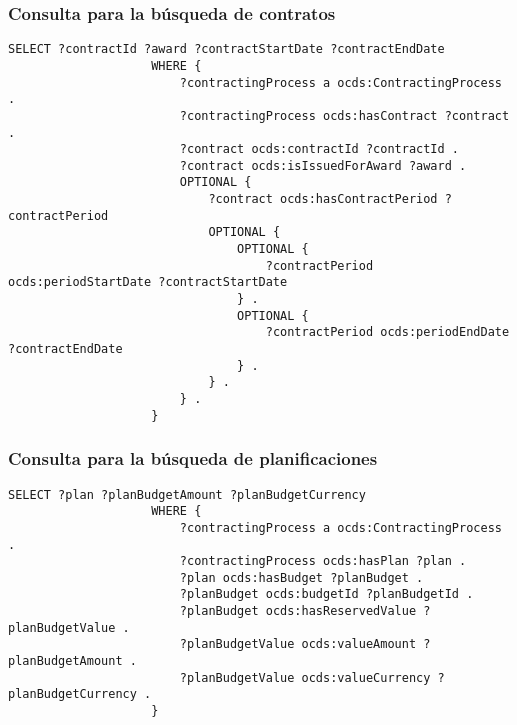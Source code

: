         \subsubsection{Consulta para la búsqueda de contratos}
            \begin{minipage}{\linewidth}
                \begin{lstlisting}[language=lSPARQL]
                    SELECT ?contractId ?award ?contractStartDate ?contractEndDate
                    WHERE {
                        ?contractingProcess a ocds:ContractingProcess .
                        ?contractingProcess ocds:hasContract ?contract .
                        ?contract ocds:contractId ?contractId .
                        ?contract ocds:isIssuedForAward ?award .
                        OPTIONAL {
                            ?contract ocds:hasContractPeriod ?contractPeriod
                            OPTIONAL {
                                OPTIONAL {
                                    ?contractPeriod ocds:periodStartDate ?contractStartDate
                                } .
                                OPTIONAL {
                                    ?contractPeriod ocds:periodEndDate ?contractEndDate
                                } .
                            } .
                        } .
                    }
                \end{lstlisting}
            \end{minipage}
            
        \subsubsection{Consulta para la búsqueda de planificaciones}
            \begin{minipage}{\linewidth}
                \begin{lstlisting}[language=lSPARQL]
                    SELECT ?plan ?planBudgetAmount ?planBudgetCurrency
                    WHERE {
                        ?contractingProcess a ocds:ContractingProcess .
                        ?contractingProcess ocds:hasPlan ?plan .
                        ?plan ocds:hasBudget ?planBudget .
                        ?planBudget ocds:budgetId ?planBudgetId .
                        ?planBudget ocds:hasReservedValue ?planBudgetValue .
                        ?planBudgetValue ocds:valueAmount ?planBudgetAmount .
                        ?planBudgetValue ocds:valueCurrency ?planBudgetCurrency .
                    }
                \end{lstlisting}
            \end{minipage}
            
